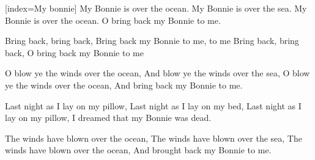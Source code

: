 [index={My bonnie}]
\beginverse
My Bonnie is over the ocean.
My Bonnie is over the sea.
My Bonnie is over the ocean.
O bring back my Bonnie to me.
\endverse

\beginchorus
Bring back, bring back,
Bring back my Bonnie to me, to me
Bring back, bring back,
O bring back my Bonnie to me
\endchorus

\beginverse
O blow ye the winds over the ocean,
And blow ye the winds over the sea,
O blow ye the winds over the ocean,
And bring back my Bonnie to me.
\endverse

\beginverse
Last night as I lay on my pillow,
Last night as I lay on my bed,
Last night as I lay on my pillow,
I dreamed that my Bonnie was dead.
\endverse

\beginverse
The winds have blown over the ocean,
The winds have blown over the sea,
The winds have blown over the ocean,
And brought back my Bonnie to me.
\endverse

\endsong